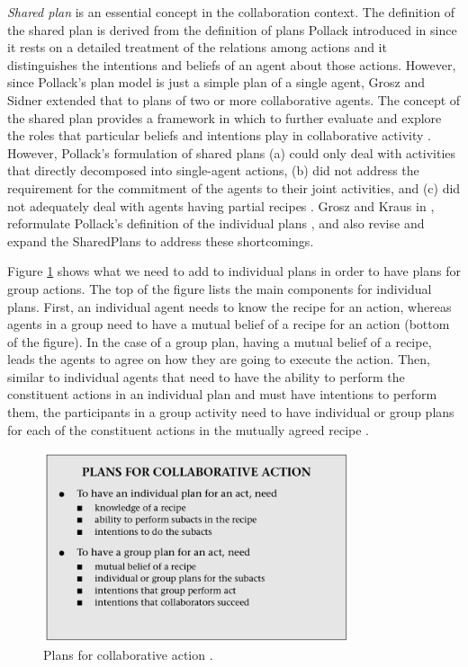 \documentclass[12pt]{report}
\begin{document}
\textit{Shared plan} is an essential concept in the collaboration context.
The definition of the shared plan is derived from the definition of plans
Pollack introduced in \cite{pollack:plan-inference,
pollack:plan-mental-attitudes} since it rests on a detailed treatment of the
relations among actions and it distinguishes the intentions and beliefs of an
agent about those actions. However, since Pollack's plan model is just a simple
plan of a single agent, Grosz and Sidner extended that to plans of two or more
collaborative agents. The concept of the shared plan provides a framework in
which to further evaluate and explore the roles that particular beliefs and
intentions play in collaborative activity \cite{lochbaum:plan-models}. However,
Pollack's formulation of shared plans (a) could only deal with activities that
directly decomposed into single-agent actions, (b) did not address the
requirement for the commitment of the agents to their joint activities, and (c)
did not adequately deal with agents having partial recipes
\cite{grosz:collaboration}. Grosz and Kraus in \cite{grosz:collaboration},
reformulate Pollack's definition of the individual plans
\cite{pollack:plan-mental-attitudes}, and also revise and expand the SharedPlans
to address these shortcomings.

Figure \ref{fig:plans} shows what we need to add to individual plans in order to
have plans for group actions. The top of the figure lists the main components
for individual plans. First, an individual agent needs to know the recipe for an
action, whereas agents in a group need to have a mutual belief of a recipe for
an action (bottom of the figure). In the case of a group plan, having a mutual
belief of a recipe, leads the agents to agree on how they are going to execute
the action. Then, similar to individual agents that need to have the ability to
perform the constituent actions in an individual plan and must have intentions
to perform them, the participants in a group activity need to have individual or
group plans for each of the constituent actions in the mutually agreed recipe
\cite{grosz:collaborative-systems, grosz:plans-discourse}.

\vspace*{-3mm}
\begin{figure}[tbh]
  \center
  \includegraphics[width=0.8\textwidth]{figure/plans.png}
  \caption{Plans for collaborative action \cite{grosz:collaborative-systems}.}
  \vspace*{-5mm}
  \label{fig:plans}
\end{figure}
\end{document}
